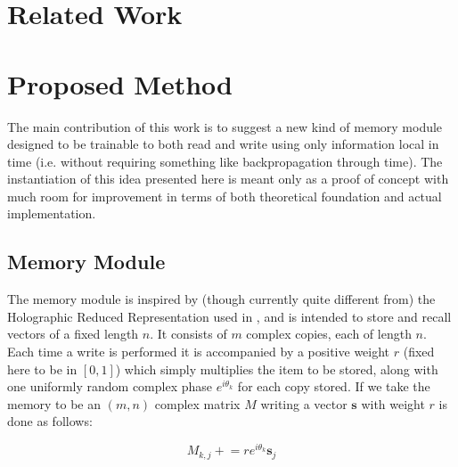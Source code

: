 \documentclass{article}
\begin{document}
\section*{Related Work}

\section*{Proposed Method}
The main contribution of this work is to suggest a new kind of memory module designed to be trainable to both read and write using only information local in time (i.e. without requiring something like backpropagation through time). The instantiation of this idea presented here is meant only as a proof of concept with much room for improvement in terms of both theoretical foundation and actual implementation.
\subsection*{Memory Module}
The memory module is inspired by (though currently quite different from) the Holographic Reduced Representation used in \cite{LSTM}, and is intended to store and recall vectors of a fixed length $n$. It consists of $m$ complex copies, each of length $n$. Each time a write is performed it is accompanied by a positive weight $r$ (fixed here to be in $[0,1]$) which simply multiplies the item to be stored, along with one uniformly random complex phase $e^{i\theta_k}$ for each copy stored. If we take the memory to be an $(m,n)$ complex matrix $M$ writing a vector $\pmb{s}$ with weight $r$ is done as follows:

$$M_{k,j}\mathrel{+}=re^{i\theta_k}\pmb{s}_j$$
\end{document}
